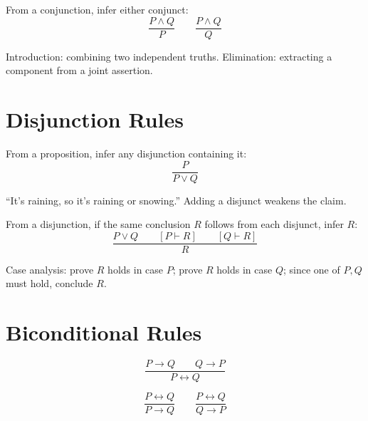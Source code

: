 \begin{definition}\label{def:conj-e}
From a conjunction, infer either conjunct:
\[
\frac{P \wedge Q}{P} \qquad \frac{P \wedge Q}{Q}
\]
\end{definition}

\begin{remark}[Intuition] Introduction: combining two independent truths.
Elimination: extracting a component from a joint assertion.
\end{remark}

\section*{Disjunction Rules}

\begin{definition}\label{def:disj-i}
From a proposition, infer any disjunction containing it:
\[
\frac{P}{P \vee Q}
\]
\end{definition}

\begin{remark}[Intuition] ``It's raining, so it's raining or snowing.'' Adding
a disjunct weakens the claim.
\end{remark}

\begin{definition}\label{def:disj-e}
From a disjunction, if the same conclusion $R$ follows from each disjunct, infer $R$:
\[
\frac{P \vee Q \qquad [P \vdash R] \qquad [Q \vdash R]}{R}
\]
\end{definition}

\begin{remark} Case analysis: prove $R$ holds in case $P$;
prove $R$ holds in case $Q$; since one of $P, Q$ must hold, conclude $R$.
\end{remark}

\section*{Biconditional Rules}

\begin{definition}\label{def:bicond-i}
\[
\frac{P \rightarrow Q \qquad Q \rightarrow P}{P \leftrightarrow Q}
\]
\end{definition}

\begin{definition}\label{def:bicond-e}
\[
\frac{P \leftrightarrow Q}{P \rightarrow Q} \qquad \frac{P \leftrightarrow Q}{Q \rightarrow P}
\]
\end{definition}


